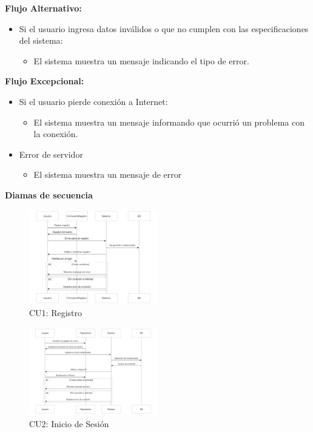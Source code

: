 \textbf{Flujo Alternativo:}
\begin{itemize}
\item Si el usuario ingresa datos inválidos o que no cumplen con las especificaciones del sistema:
\begin{itemize}
\item El sistema muestra un mensaje indicando el tipo de error.
\end{itemize}
\end{itemize}

\textbf{Flujo Excepcional:}
\begin{itemize}
\item Si el usuario pierde conexión a Internet:
\begin{itemize}
\item El sistema muestra un mensaje informando que ocurrió un problema con la conexión.
\end{itemize}
\item Error de servidor
\begin{itemize}
    \item El sistema muestra un mensaje de error
\end{itemize}
\end{itemize}

\textbf{Diamas de secuencia}
\begin{figure}[h]
    \centering
    \includegraphics[width=0.5\textwidth]{img/cu1.png} %
    \caption{CU1: Registro}
    \label{fig: 1}
\end{figure} 

\begin{figure}[h]
    \centering
    \includegraphics[width=0.5\textwidth]{img/cu2.png} %
    \caption{CU2: Inicio de Sesión}
    \label{fig: 1}
\end{figure}


